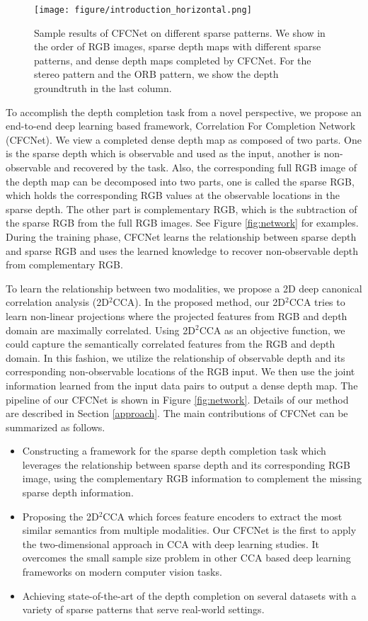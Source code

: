 \documentclass{article}
\begin{document}
\begin{figure}[bt!]
    \centering
    \texttt{[image: figure/introduction\_horizontal.png]}
    \caption{Sample results of CFCNet on different sparse patterns. We show in the order of RGB images, sparse depth maps with different sparse patterns, and dense depth maps completed by CFCNet. For the stereo pattern and the ORB pattern, we show the depth groundtruth in the last column.}
    \label{fig:introduction}
\end{figure}

To accomplish the depth completion task from a novel perspective, we propose an end-to-end deep learning based framework, Correlation For Completion Network (CFCNet). We view a completed dense depth map as composed of two parts. One is the sparse depth which is observable and used as the input, another is non-observable and recovered by the task. Also, the corresponding full RGB image of the depth map can be decomposed into two parts, one is called the sparse RGB, which holds the corresponding RGB values at the observable locations in the sparse depth. The other part is complementary RGB, which is the subtraction of the sparse RGB from the full RGB images. See Figure \ref{fig:network} for examples. During the training phase, CFCNet learns the relationship between sparse depth and sparse RGB and uses the learned knowledge to recover non-observable depth from complementary RGB.

To learn the relationship between two modalities, we propose a 2D deep canonical correlation analysis (2D$^2$CCA). In the proposed method, our 2D$^2$CCA tries to learn non-linear projections where the projected features from RGB and depth domain are maximally correlated. Using 2D$^2$CCA as an objective function, we could capture the semantically correlated features from the RGB and depth domain. In this fashion, we utilize the relationship of observable depth and its corresponding non-observable locations of the RGB input. We then use the joint information learned from the input data pairs to output a dense depth map. The pipeline of our CFCNet is shown in Figure \ref{fig:network}. Details of our method are described in Section \ref{approach}. The main contributions of CFCNet can be summarized as follows.
\begin{itemize}
\setlength\itemsep{0cm}
    \item Constructing a framework for the sparse depth completion task which leverages the relationship between sparse depth and its corresponding RGB image, using the complementary RGB information to complement the missing sparse depth information. 
    \item Proposing the 2D$^2$CCA which forces feature encoders to extract the most similar semantics from multiple modalities. Our CFCNet is the first to apply the two-dimensional approach in CCA with deep learning studies. It overcomes the small sample size problem in other CCA based deep learning frameworks on modern computer vision tasks.
    \item Achieving state-of-the-art of the depth completion on several datasets with a variety of sparse patterns that serve real-world settings.
\end{itemize}
\end{document}
